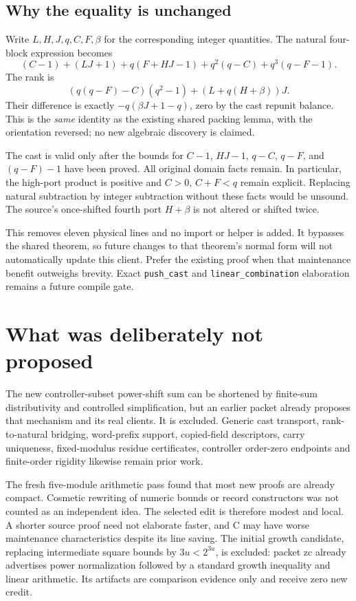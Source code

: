 \subsection{Why the equality is unchanged}
Write $L,H,J,q,C,F,\beta$ for the corresponding integer quantities. The natural four-block expression becomes
\[
 (C-1)+(LJ+1)+q(F+HJ-1)+q^2(q-C)+q^3(q-F-1).
\]
The rank is
\[
 (q(q-F)-C)(q^2-1)+(L+q(H+\beta))J.
\]
Their difference is exactly $-q(\beta J+1-q)$, zero by the cast repunit balance. This is the \emph{same} identity as the existing shared packing lemma, with the orientation reversed; no new algebraic discovery is claimed.

The cast is valid only after the bounds for $C-1$, $HJ-1$, $q-C$, $q-F$, and $(q-F)-1$ have been proved. All original domain facts remain. In particular, the high-port product is positive and $C>0$, $C+F<q$ remain explicit. Replacing natural subtraction by integer subtraction without these facts would be unsound. The source's once-shifted fourth port $H+\beta$ is not altered or shifted twice.

\risk{} This removes eleven physical lines and no import or helper is added. It bypasses the shared theorem, so future changes to that theorem's normal form will not automatically update this client. Prefer the existing proof when that maintenance benefit outweighs brevity. Exact \texttt{push\_cast} and \texttt{linear\_combination} elaboration remains a future compile gate.
\newpage
\section{What was deliberately not proposed}
The new controller-subset power-shift sum can be shortened by finite-sum distributivity and controlled simplification, but an earlier packet already proposes that mechanism and its real clients. It is excluded. Generic cast transport, rank-to-natural bridging, word-prefix support, copied-field descriptors, carry uniqueness, fixed-modulus residue certificates, controller order-zero endpoints and finite-order rigidity likewise remain prior work.

The fresh five-module arithmetic pass found that most new proofs are already compact. Cosmetic rewriting of numeric bounds or record constructors was not counted as an independent idea. The selected edit is therefore modest and local. A shorter source proof need not elaborate faster, and C may have worse maintenance characteristics despite its line saving. The initial growth candidate, replacing intermediate square bounds by $3u<2^{3u}$, is excluded: packet zc already advertises power normalization followed by a standard growth inequality and linear arithmetic. Its artifacts are comparison evidence only and receive zero new credit.
